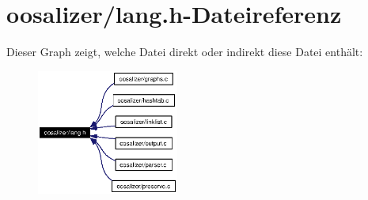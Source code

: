 \section{oosalizer/lang.h-Dateireferenz}
\label{lang_8h}


Dieser Graph zeigt, welche Datei direkt oder indirekt diese Datei enth\"{a}lt:\begin{figure}[H]
\begin{center}
\leavevmode
\includegraphics[width=132pt]{lang_8h__dep__incl}
\end{center}
\end{figure}
